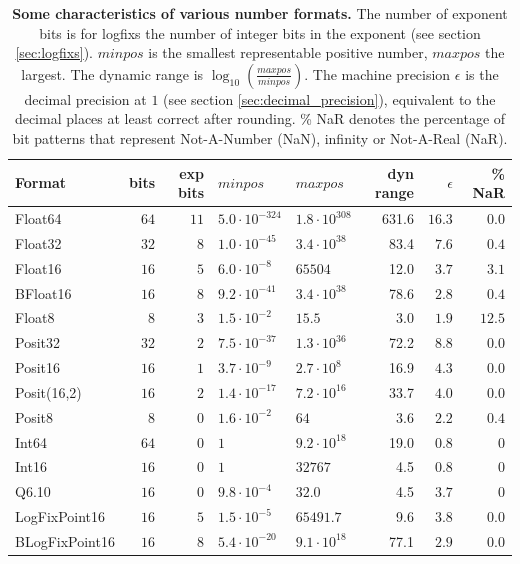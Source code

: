 \begin{table}[htbp]
	\center
	\begin{tabular}{l | r | r | l | l | r | r | r}
	\textbf{Format} & bits & exp bits & $minpos$ & $maxpos$ & dyn range & $\epsilon$ &  \% NaR \\
	\hline
	Float64    & $64$ & $11$ & $5.0 \cdot 10^{-324}$ & $1.8 \cdot 10^{308}$ & 631.6 & $16.3$ & $0.0$ \\
	Float32    & $32$ & $8$ & $1.0 \cdot 10^{-45}$ & $3.4 \cdot 10^{38}$ & 83.4 & $7.6$ & $0.4$ \\
	Float16    & $16$ & $5$ & $6.0 \cdot 10^{-8}$ & $65504$ & 12.0 & $3.7$ & $3.1$ \\
	BFloat16    & $16$ & $8$ & $ 9.2 \cdot 10^{-41}$ & $3.4 \cdot 10^{38}$ & 78.6 & $2.8$ & $0.4$  \\
        Float8 & $8$ & $3$ & $1.5 \cdot 10^{-2}$ & $15.5$ & 3.0 & $1.9$ & $12.5$\\
        \hline
        Posit32 & $32$ & $2$ &  $7.5 \cdot 10^{-37}$ & $1.3 \cdot 10^{36}$ & 72.2 & $8.8$ & $0.0$ \\
        Posit16 & $16$ & $1$ & $3.7 \cdot 10^{-9}$ & $2.7 \cdot 10^{8}$ & 16.9 & $4.3$ & $0.0$\\
        Posit(16,2) & $16$ & $2$ & $1.4 \cdot 10^{-17}$ & $7.2 \cdot 10^{16}$ & 33.7 & $4.0$ & $0.0$\\
        Posit8 & $8$ & $0$ & $1.6 \cdot 10^{-2}$ & $64$ & 3.6 & $2.2$ & $0.4$  \\
        \hline
        Int64 & $64$ & $0$ & $1$ & $9.2 \cdot 10^{18}$ & 19.0 & $0.8$ & $0$\\
        Int16 & $16$ & $0$ & $1$ & $32767$ & 4.5 & $0.8$ & $0$\\
        Q6.10 & $16$ & $0$ & $9.8 \cdot 10^{-4}$ & $32.0$ & 4.5 & $3.7$ & $0$\\
        \hline
        LogFixPoint16 & $16$ & $5$ & $1.5 \cdot 10^{-5}$ & $65491.7$ & 9.6 & $3.8$ & $0.0$\\
        BLogFixPoint16 & $16$ & $8$ & $5.4 \cdot 10^{-20}$ & $9.1 \cdot 10^{18}$ & 77.1 & $2.9$ & $0.0$
        \end{tabular}
        \vspace{10pt}
	\caption{\textbf{Some characteristics of various number formats.} The number of exponent bits is for logfixs the number of
	integer bits in the exponent (see section \ref{sec:logfixs}). $minpos$ is the smallest representable positive number,
	$maxpos$ the largest. The dynamic range is $\log_{10}(\tfrac{maxpos}{minpos})$. The machine precision $\epsilon$ is the decimal
	precision at $1$ (see section \ref{sec:decimal_precision}), equivalent to the decimal places at least correct after rounding.
	\% NaR denotes the percentage of bit patterns that represent Not-A-Number (NaN), infinity or Not-A-Real (NaR).}
	\label{tab:formats}
\end{table}


